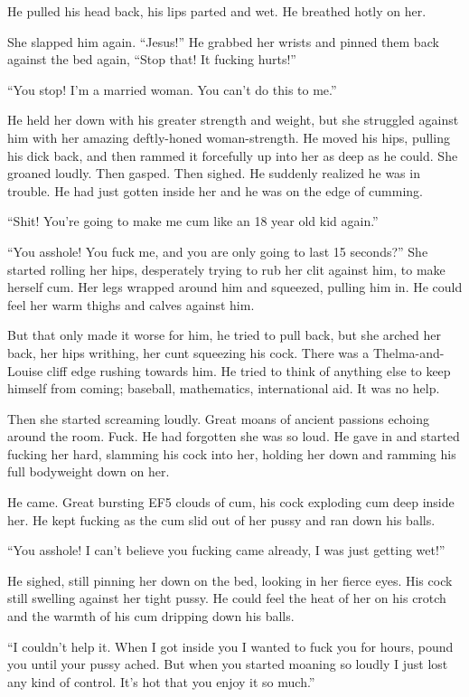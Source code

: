 \documentclass[letterpaper]{article}
\begin{document}
He pulled his head back, his lips parted and wet. He breathed hotly on her.

She slapped him again. ``Jesus!'' He grabbed her wrists and pinned them back against the bed again, ``Stop that! It fucking hurts!''

``You stop! I'm a married woman. You can't do this to me.''

He held her down with his greater strength and weight, but she struggled against him with her amazing deftly-honed woman-strength.
He moved his hips, pulling his dick back, and then rammed it forcefully up into her as deep as he could.
She groaned loudly. Then gasped. Then sighed. He suddenly realized he was in trouble. He had just gotten inside her and he was on the edge of cumming.

``Shit! You're going to make me cum like an 18 year old kid again.''

``You asshole! You fuck me, and you are only going to last 15 seconds?'' She started rolling her hips, desperately trying to rub her clit against him, to make herself cum. Her legs wrapped around him and squeezed, pulling him in. He could feel her warm thighs and calves against him.

But that only made it worse for him, he tried to pull back, but she arched her back, her hips writhing, her cunt squeezing his cock. There was a Thelma-and-Louise cliff edge rushing towards him.
He tried to think of anything else to keep himself from coming; baseball, mathematics, international aid. It was no help.

Then she started screaming loudly. Great moans of ancient passions echoing around the room. Fuck. He had forgotten she was so loud. He gave in and started fucking her hard, slamming his cock into her, holding her down and ramming his full bodyweight down on her.

He came. Great bursting EF5 clouds of cum, his cock exploding cum deep inside her. He kept fucking as the cum slid out of her pussy and ran down his balls.

``You asshole! I can't believe you fucking came already, I was just getting wet!''

He sighed, still pinning her down on the bed, looking in her fierce eyes. His cock still swelling against her tight pussy. He could feel the heat of her on his crotch and the warmth of his cum dripping down his balls.

``I couldn't help it. When I got inside you I wanted to fuck you for hours, pound you until your pussy ached. But when you started moaning so loudly I just lost any kind of control. It's hot that you enjoy it so much.''
\end{document}
